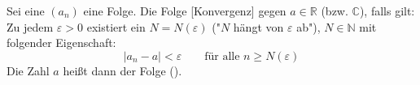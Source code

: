 Sei eine $(a_n)$ eine Folge. Die Folge [Konvergenz] gegen $a \in \mathbb{R}$ (bzw. $\mathbb{C}$), falls gilt:
Zu jedem $\varepsilon > 0$ existiert ein $N = N(\varepsilon)$ ("$N$ hängt von $\varepsilon$ ab"), $N \in \mathbb{N}$ mit folgender Eigenschaft:
$$|a_n - a| < \varepsilon \qquad \text{für alle $n \geq N(\varepsilon)$}$$
Die Zahl $a$ heißt dann  der Folge ().